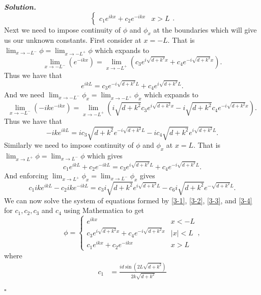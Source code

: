 \documentclass[12pt]{report}
\newenvironment{solution}[1][\it{Solution}]{\textbf{#1. } }{$\square$}
\newcommand{\paren}[1]{{\left(#1\right)}} %
\begin{document}
\begin{solution}
\[\begin{cases}
            c_1 e^{ikx} + c_2 e^{-ikx} &x > L
        \end{cases}.
    \]
    Next we need to impose continuity of $\phi$ and $\phi_x$ at the boundaries which will give us our unknown constants. First consider at $x = -L$. That is $\lim_{x \to -L^{-}} \phi = \lim_{x \to -L^{+}} \phi$ which expands to
    \[ 
         \lim_{x \to -L^{-}}\paren{e^{-ikx}} = \lim_{x \to -L^{+}} \paren{c_3 e^{i\sqrt{d + k^2}x} + c_4 e^{-i\sqrt{d + k^2}x}}.
    \] 
    Thus we have that
    \begin{equation} \label{3-1}
        e^{ikL} = c_3 e^{-i\sqrt{d + k^2}L} + c_4 e^{i\sqrt{d + k^2}L}.
    \end{equation}
    And we need $\lim_{x \to -L^{-}} \phi_x = \lim_{x \to -L^{+}} \phi_x$ which expands to
    \[
         \lim_{x \to -L^{-}}\paren{-ike^{-ikx}} = \lim_{x \to -L^{+}} \paren{i\sqrt{d + k^2} c_3  e^{i\sqrt{d + k^2}x} -i\sqrt{d + k^2}c_4 e^{-i\sqrt{d + k^2}x}}.
    \]
    Thus we have that
    \begin{equation} \label{3-2}
        -ike^{ikL} = ic_3 \sqrt{d + k^2} e^{-i\sqrt{d + k^2}L} - ic_4 \sqrt{d + k^2} e^{i\sqrt{d + k^2}L}.
    \end{equation}
    Similarly we need to impose continuity of $\phi$ and $\phi_x$ at $x = L$. That is $\lim_{x \to L^{+}} \phi = \lim_{x \to L^{-}} \phi$ which gives
    \begin{equation} \label{3-3}
        c_1 e^{ikL} + c_2e^{-ikL} = c_3 e^{i\sqrt{d + k^2}L} + c_4 e^{-i\sqrt{d + k^2}L}.
    \end{equation}
    And enforcing $\lim_{x \to L^{+}} \phi_x = \lim_{x \to L^{-}} \phi_x$ gives
    \begin{equation} \label{3-4}
        c_1 i k e^{ikL} - c_2 i k e^{-ikL} = c_3i\sqrt{d+k^2}e^{i\sqrt{d +k^2}L}-c_6i\sqrt{d+k^2}e^{-\sqrt{d+k^2}L}.
    \end{equation}
    We can now solve the system of equations formed by \ref{3-1}, \ref{3-2}, \ref{3-3}, and \ref{3-4} for $c_1,c_2,c_3$ and $c_4$ using Mathematica to get
    \[ 
        \phi = \begin{cases}
            e^{ikx} &x < -L\\
            c_3 e^{i\sqrt{d + k^2}x} + c_4 e^{-i\sqrt{d + k^2}x}&|x| < L\\
            c_1 e^{ikx} + c_2 e^{-ikx} &x > L
        \end{cases},
    \]
    where
    \begin{align*}
        c_1 &= \frac{i d \sin \left(2 L \sqrt{d+k^2}\right)}{2 k \sqrt{d+k^2}}\\

\end{align*}
\end{solution}
\end{document}
